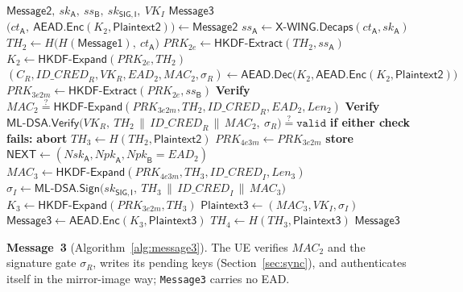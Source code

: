 \documentclass[symmetry,article,submit,moreauthors]{Definitions/mdpi}
\newcommand{\XWING}{\mathsf{X\text{-}WING}}
\begin{document}
\begin{algorithm}[H]
\caption{EDHOC \texttt{Message3} (UE $\to$ DN-AAA)}
\label{alg:message3}
{\footnotesize
\begin{algorithmic}[1]
\Require $\mathsf{Message2},\ sk_{\mathsf{A}},\ ss_{\mathsf{B}},\ sk_{\mathsf{SIG,I}},\ VK_I$
\Ensure $\mathsf{Message3}$
\State $\big(ct_{\mathsf{A}},\ \mathsf{AEAD.Enc}(K_2, \mathsf{Plaintext2})\big) \gets \mathsf{Message2}$
\State $ss_{\mathsf{A}} \gets \XWING.\mathsf{Decaps}(ct_{\mathsf{A}}, sk_{\mathsf{A}})$
\State $TH_2 \gets H\big(H(\mathsf{Message1}),\ ct_{\mathsf{A}})$
\State $PRK_{2e} \gets \mathsf{HKDF\text{-}Extract}(TH_2, ss_{\mathsf{A}})$
\State $K_2 \gets \mathsf{HKDF\text{-}Expand}(PRK_{2e}, TH_2)$
\State $(C_R, \mathit{ID\_CRED}_R, VK_R, \mathit{EAD}_2, \mathit{MAC}_2, \sigma_R) \gets \mathsf{AEAD.Dec}\big(K_2, \mathsf{AEAD.Enc}(K_2, \mathsf{Plaintext2})\big)$
\State $PRK_{3e2m} \gets \mathsf{HKDF\text{-}Extract}(PRK_{2e}, ss_{\mathsf{B}})$
\State \textbf{Verify} $\mathit{MAC}_2 \overset{?}{=} \mathsf{HKDF\text{-}Expand}(PRK_{3e2m}, TH_2, \mathit{ID\_CRED}_R, \mathit{EAD}_2, \mathit{Len}_2)$ 
\State \textbf{Verify} $\mathsf{ML\text{-}DSA.Verify}\big(VK_R,\ TH_2 \,\|\, \mathit{ID\_CRED}_R \,\|\, \mathit{MAC}_2,\ \sigma_R\big) \overset{?}{=} \mathtt{valid}$ 
\State \textbf{if either check fails:} \textbf{abort}
\State $TH_3 \gets H(TH_2, \mathsf{Plaintext2})$
\State $PRK_{4e3m} \gets PRK_{3e2m}$ 
\State \textbf{store} $\mathsf{NEXT} \gets (\mathit{Nsk}_{\mathsf{A}}, \mathit{Npk}_{\mathsf{A}}, \mathit{Npk}_{\mathsf{B}} = \mathit{EAD}_2)$ 
\State $\mathit{MAC}_3 \gets \mathsf{HKDF\text{-}Expand}(PRK_{4e3m}, TH_3, \mathit{ID\_CRED}_I, \mathit{Len}_3)$
\State $\sigma_I \gets \mathsf{ML\text{-}DSA.Sign}\big(sk_{\mathsf{SIG,I}},\ TH_3 \,\|\, \mathit{ID\_CRED}_I \,\|\, \mathit{MAC}_3\big)$ 
\State $K_3 \gets \mathsf{HKDF\text{-}Expand}(PRK_{3e2m}, TH_3)$
\State $\mathsf{Plaintext3} \gets (\mathit{MAC}_3, VK_I, \sigma_I)$
\State $\mathsf{Message3} \gets \mathsf{AEAD.Enc}(K_3, \mathsf{Plaintext3})$
\State $TH_4 \gets H(TH_3, \mathsf{Plaintext3})$
\State \Return $\mathsf{Message3}$
\end{algorithmic}
}
\end{algorithm}

\textbf{Message~3} (Algorithm~\ref{alg:message3}). The UE verifies $\mathit{MAC}_2$ and the signature gate $\sigma_R$, writes its pending keys (Section~\ref{sec:sync}), and authenticates itself in the mirror-image way; \texttt{Message3} carries no EAD.
\end{document}
